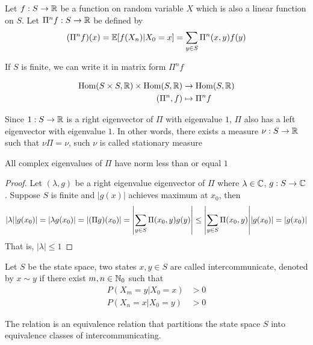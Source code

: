 \documentclass{report}
\begin{document}
\begin{proposition}
	Let $f: S \to \mathbb{R}$ be a function on random variable $X$ which is also a linear function on $S$. Let $\Pi^n f: S \to \mathbb{R}$ be defined by
	$$
		(\Pi^n f)(x) = \mathbb{E}[f(X_n) | X_0 = x]= \sum_{y \in S} \Pi^n(x, y) f(y)
	$$
	
	If $S$ is finite, we can write it in matrix form $\Pi^n f$
    
    \begin{align*}
    	\operatorname{Hom}(S \times S, \mathbb{R}) \times \operatorname{Hom}(S, \mathbb{R})&\to \operatorname{Hom}(S, \mathbb{R}) \\
    	(\Pi^n, f) &\mapsto \Pi^n f
    \end{align*}
\end{proposition}

\begin{proposition}
    Since $1: S \to \mathbb{R}$ is a right eigenvector of $\Pi$ with eigenvalue $1$, $\Pi$ also has a left eigenvector with eigenvalue $1$. In other words, there exists a measure $\nu: S \to \mathbb{R}$ such that $\nu \Pi = \nu$, such $\nu$ is called stationary measure
\end{proposition}
    
\begin{proposition}[spectrum of $\Pi$]
    All complex eigenvalues of $\Pi$ have norm less than or equal $1$
\begin{proof}
    Let $(\lambda, g)$ be a right eigenvalue eigenvector of $\Pi$ where $\lambda \in \mathbb{C}$, $g: S \to \mathbb{C}$. Suppose $S$ is finite and $|g(x)|$ achieves maximum at $x_0$, then
    $$
        |\lambda| |g(x_0)| = |\lambda g(x_0)| = |(\Pi g) (x_0)| = \abs*{\sum_{y \in S} \Pi(x_0, y) g(y)} \leq \abs*{\sum_{y \in S} \Pi(x_0, y)} |g(x_0)| = |g(x_0)|
    $$
    That is, $|\lambda| \leq 1$
\end{proof}
\end{proposition}

\begin{proposition}
    Let $S$ be the state space, two states $x, y \in S$ are called intercommunicate, denoted by $x \sim y$ if there exist $m, n \in \mathbb{N}_0$ such that
    \begin{align*}
        P(X_m = y | X_0 = x) &> 0 \\
        P(X_n = x | X_0 = y) &> 0
    \end{align*}
    
    The relation is an equivalence relation that partitions the state space $S$ into equivalence classes of intercommunicating.
\end{proposition}
\end{document}
